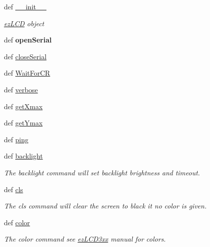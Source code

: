 \begin{DoxyCompactItemize}
\item 
def \hyperlink{namespaceez_l_c_d3xx_a222407eee66a635a2df59ffd7b9c4252}{\-\_\-\-\_\-init\-\_\-\-\_\-}
\begin{DoxyCompactList}\small\item\em \hyperlink{classez_l_c_d3xx_1_1ez_l_c_d}{ez\-L\-C\-D} object \end{DoxyCompactList}\item 
\hypertarget{namespaceez_l_c_d3xx_ae43124104a126749f7775a77e5339ce6}{def {\bfseries open\-Serial}}\label{namespaceez_l_c_d3xx_ae43124104a126749f7775a77e5339ce6}

\item 
def \hyperlink{namespaceez_l_c_d3xx_ac758f44d3aa2892d8946d422282c800c}{close\-Serial}
\item 
def \hyperlink{namespaceez_l_c_d3xx_a685d0b172e0c0099f6dda0fbc4d820ad}{Wait\-For\-C\-R}
\item 
def \hyperlink{namespaceez_l_c_d3xx_aa497e8573c045944d589b17fd7dd36ac}{verbose}
\item 
def \hyperlink{namespaceez_l_c_d3xx_ad59d1a1be500396637ab3a9af458137b}{get\-Xmax}
\item 
def \hyperlink{namespaceez_l_c_d3xx_a0f93ca5a289cbd9f7bded58ec120b6a9}{get\-Ymax}
\item 
def \hyperlink{namespaceez_l_c_d3xx_a92454899475445ff2d48eb7072f3c94e}{ping}
\item 
def \hyperlink{namespaceez_l_c_d3xx_acecf5c1b5956caef4a4030f51bc4a809}{backlight}
\begin{DoxyCompactList}\small\item\em The backlight command will set backlight brightness and timeout. \end{DoxyCompactList}\item 
def \hyperlink{group___drawing_gacdfb97b09494d0e3cec787014c4863f9}{cls}
\begin{DoxyCompactList}\small\item\em The cls command will clear the screen to black it no color is given. \end{DoxyCompactList}\item 
def \hyperlink{group___drawing_ga306a0e99b15bc1122683a1c6e18e7ef0}{color}
\begin{DoxyCompactList}\small\item\em The color command see \hyperlink{namespaceez_l_c_d3xx}{ez\-L\-C\-D3xx} manual for colors. \end{DoxyCompactList}\item 

\end{DoxyCompactItemize}
